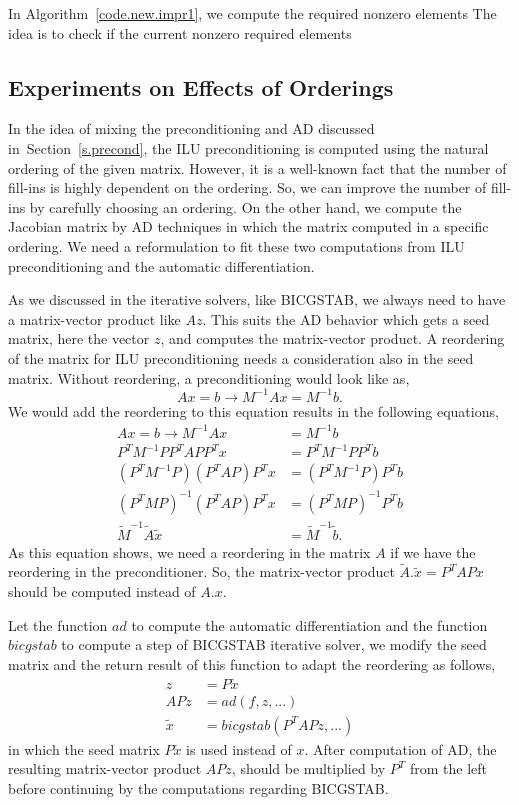 \documentclass[12pt, twoside]{book}
\newcommand{\secref}[1]{Section~\protect\ref{#1}}
\newcommand{\coderef}[1]{Algorithm~\protect\ref{#1}}
\begin{document}
In \coderef{code.new.impr1}, we compute the required nonzero elements 
The idea is to check if the current nonzero required elements

\subsection{Experiments on Effects of Orderings}
\label{s.ilu}
In the idea of mixing the preconditioning and AD discussed in~\secref{s.precond},
the ILU preconditioning is computed using the natural ordering of the given matrix. However,
it is a well-known fact that the number of fill-ins is highly dependent on the ordering.
So, we can improve the number of fill-ins by carefully choosing an ordering.
On the other hand, we compute the Jacobian matrix by AD techniques in which
the matrix computed in a specific ordering. We need a reformulation to
fit these two computations from ILU preconditioning and the automatic differentiation.

As we discussed in the iterative solvers, like BICGSTAB,
we always need to have a matrix-vector product like $Az$.
This suits the AD behavior which gets a seed matrix, here the vector $z$, and
computes the matrix-vector product.
A reordering of the matrix for ILU preconditioning
needs a consideration also in the seed matrix.
Without reordering, a preconditioning would look like as,
$$
Ax = b \rightarrow M^{-1} Ax = M^{-1}b.
$$
We would add the reordering to this equation results in the following equations,
\begin{align*}
Ax = b \rightarrow M^{-1} Ax &= M^{-1}b\\
P^T M^{-1} P P^T A P P^T x &= P^T M^{-1} P P^T b\\
(P^T M^{-1} P) (P^T A P) P^T x &= (P^T M^{-1} P) P^T b\\
(P^T M P)^{-1} (P^T A P) P^T x &= (P^T M P)^{-1} P^T b\\
\tilde{M}^{-1}\tilde{A}\tilde{x} &= \tilde{M}^{-1}\tilde{b}.
\end{align*}
As this equation shows, we need a reordering in the matrix $A$ if we
have the reordering in the preconditioner.
So, the matrix-vector product $\tilde{A}.\tilde{x} = P^T A P x$
should be computed instead of $A.x$.

Let the function $ad$ to compute the automatic differentiation
and the function $bicgstab$ to compute a step of BICGSTAB iterative solver,
we modify the seed matrix and the return result of this function
to adapt the reordering as follows,
\begin{align*}
z &= P \tilde{x}\\
APz &= ad(f,z,...)\\
\tilde{x} &= bicgstab(P^T APz,...)
\end{align*}
in which the seed matrix $P \tilde{x}$ is used instead of $x$.
After computation of AD, the resulting matrix-vector product $APz$,
should be multiplied by $P^T$ from the left before continuing by the
computations regarding BICGSTAB.
\end{document}
